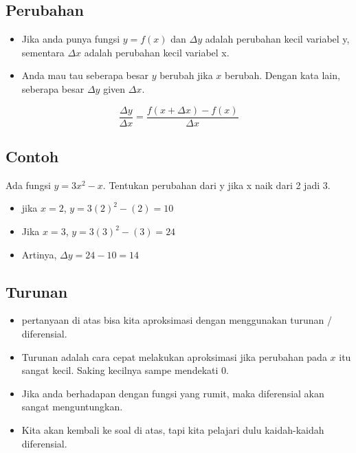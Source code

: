 \documentclass[
  letterpaper,
  DIV=11,
  numbers=noendperiod]{scrartcl}
\begin{document}
\hypertarget{perubahan}{%
\subsection{Perubahan}\label{perubahan}}

\begin{itemize}
\item
  Jika anda punya fungsi \(y=f(x)\) dan \(\Delta y\) adalah perubahan
  kecil variabel y, sementara \(\Delta x\) adalah perubahan kecil
  variabel x.
\item
  Anda mau tau seberapa besar \(y\) berubah jika \(x\) berubah. Dengan
  kata lain, seberapa besar \(\Delta y\) given \(\Delta x\).
\end{itemize}

\[
\frac{\Delta y}{\Delta x}=\frac{f(x+\Delta x)-f(x)}{\Delta x}
\]

\hypertarget{contoh-5}{%
\subsection{Contoh}\label{contoh-5}}

Ada fungsi \(y=3x^2-x\). Tentukan perubahan dari y jika x naik dari 2
jadi 3.

\begin{itemize}
\item
  jika \(x=2\), \(y=3(2)^2-(2)=10\)
\item
  Jika \(x=3\), \(y=3(3)^2-(3)=24\)
\item
  Artinya, \(\Delta y=24-10=14\)
\end{itemize}

\hypertarget{turunan}{%
\subsection{Turunan}\label{turunan}}

\begin{itemize}
\item
  pertanyaan di atas bisa kita aproksimasi dengan menggunakan turunan /
  diferensial.
\item
  Turunan adalah cara cepat melakukan aproksimasi jika perubahan pada
  \(x\) itu sangat kecil. Saking kecilnya sampe mendekati 0.
\item
  Jika anda berhadapan dengan fungsi yang rumit, maka diferensial akan
  sangat menguntungkan.
\item
  Kita akan kembali ke soal di atas, tapi kita pelajari dulu
  kaidah-kaidah diferensial.
\end{itemize}
\end{document}
